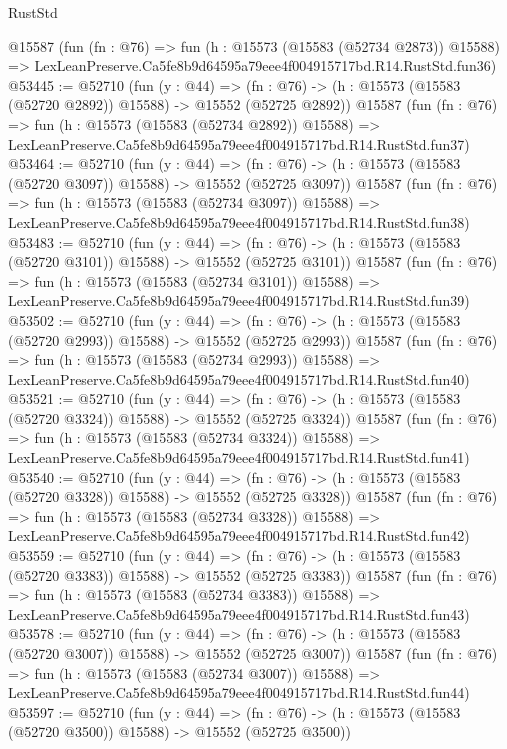 \begin{lexlean}{RustStd}
\begin{coremodule}
    @15587
    (fun (fn : @76) =>
    fun (h : @15573 (@15583 (@52734 @2873)) @15588) =>
    LexLeanPreserve.Ca5fe8b9d64595a79eee4f004915717bd.R14.RustStd.fun36)
@53445 := @52710
    (fun (y : @44) =>
    (fn : @76) -> (h : @15573 (@15583 (@52720 @2892)) @15588) -> @15552 (@52725 @2892))
    @15587
    (fun (fn : @76) =>
    fun (h : @15573 (@15583 (@52734 @2892)) @15588) =>
    LexLeanPreserve.Ca5fe8b9d64595a79eee4f004915717bd.R14.RustStd.fun37)
@53464 := @52710
    (fun (y : @44) =>
    (fn : @76) -> (h : @15573 (@15583 (@52720 @3097)) @15588) -> @15552 (@52725 @3097))
    @15587
    (fun (fn : @76) =>
    fun (h : @15573 (@15583 (@52734 @3097)) @15588) =>
    LexLeanPreserve.Ca5fe8b9d64595a79eee4f004915717bd.R14.RustStd.fun38)
@53483 := @52710
    (fun (y : @44) =>
    (fn : @76) -> (h : @15573 (@15583 (@52720 @3101)) @15588) -> @15552 (@52725 @3101))
    @15587
    (fun (fn : @76) =>
    fun (h : @15573 (@15583 (@52734 @3101)) @15588) =>
    LexLeanPreserve.Ca5fe8b9d64595a79eee4f004915717bd.R14.RustStd.fun39)
@53502 := @52710
    (fun (y : @44) =>
    (fn : @76) -> (h : @15573 (@15583 (@52720 @2993)) @15588) -> @15552 (@52725 @2993))
    @15587
    (fun (fn : @76) =>
    fun (h : @15573 (@15583 (@52734 @2993)) @15588) =>
    LexLeanPreserve.Ca5fe8b9d64595a79eee4f004915717bd.R14.RustStd.fun40)
@53521 := @52710
    (fun (y : @44) =>
    (fn : @76) -> (h : @15573 (@15583 (@52720 @3324)) @15588) -> @15552 (@52725 @3324))
    @15587
    (fun (fn : @76) =>
    fun (h : @15573 (@15583 (@52734 @3324)) @15588) =>
    LexLeanPreserve.Ca5fe8b9d64595a79eee4f004915717bd.R14.RustStd.fun41)
@53540 := @52710
    (fun (y : @44) =>
    (fn : @76) -> (h : @15573 (@15583 (@52720 @3328)) @15588) -> @15552 (@52725 @3328))
    @15587
    (fun (fn : @76) =>
    fun (h : @15573 (@15583 (@52734 @3328)) @15588) =>
    LexLeanPreserve.Ca5fe8b9d64595a79eee4f004915717bd.R14.RustStd.fun42)
@53559 := @52710
    (fun (y : @44) =>
    (fn : @76) -> (h : @15573 (@15583 (@52720 @3383)) @15588) -> @15552 (@52725 @3383))
    @15587
    (fun (fn : @76) =>
    fun (h : @15573 (@15583 (@52734 @3383)) @15588) =>
    LexLeanPreserve.Ca5fe8b9d64595a79eee4f004915717bd.R14.RustStd.fun43)
@53578 := @52710
    (fun (y : @44) =>
    (fn : @76) -> (h : @15573 (@15583 (@52720 @3007)) @15588) -> @15552 (@52725 @3007))
    @15587
    (fun (fn : @76) =>
    fun (h : @15573 (@15583 (@52734 @3007)) @15588) =>
    LexLeanPreserve.Ca5fe8b9d64595a79eee4f004915717bd.R14.RustStd.fun44)
@53597 := @52710
    (fun (y : @44) =>
    (fn : @76) -> (h : @15573 (@15583 (@52720 @3500)) @15588) -> @15552 (@52725 @3500))

\end{coremodule}
\end{lexlean}
